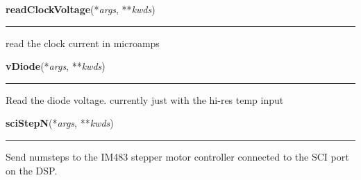     \label{dsp:readClockVoltage}

    \vspace{0.5ex}

    \begin{boxedminipage}{\textwidth}

    \raggedright \textbf{readClockVoltage}(*\textit{args}, **\textit{kwds})

    \vspace{-1.5ex}

    \rule{\textwidth}{0.5\fboxrule}
    read the clock current in microamps

    \vspace{1ex}

    \end{boxedminipage}

    \label{dsp:vDiode}

    \vspace{0.5ex}

    \begin{boxedminipage}{\textwidth}

    \raggedright \textbf{vDiode}(*\textit{args}, **\textit{kwds})

    \vspace{-1.5ex}

    \rule{\textwidth}{0.5\fboxrule}
    Read the diode voltage. currently just with the hi-res temp input

    \vspace{1ex}

    \end{boxedminipage}

    \label{dsp:sciStepN}

    \vspace{0.5ex}

    \begin{boxedminipage}{\textwidth}

    \raggedright \textbf{sciStepN}(*\textit{args}, **\textit{kwds})

    \vspace{-1.5ex}

    \rule{\textwidth}{0.5\fboxrule}
    Send numsteps to the IM483 stepper motor controller connected to the 
    SCI port on the DSP.

    \vspace{1ex}

    \end{boxedminipage}

